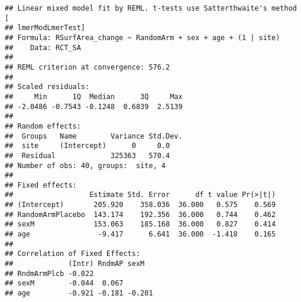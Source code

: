 \documentclass[]{article}
\theoremstyle{definition}
\theoremstyle{definition}
\theoremstyle{definition}
\theoremstyle{remark}
\begin{document}
\begin{verbatim}
## Linear mixed model fit by REML. t-tests use Satterthwaite's method [
## lmerModLmerTest]
## Formula: RSurfArea_change ~ RandomArm + sex + age + (1 | site)
##    Data: RCT_SA
## 
## REML criterion at convergence: 576.2
## 
## Scaled residuals: 
##     Min      1Q  Median      3Q     Max 
## -2.0486 -0.7543 -0.1248  0.6839  2.5139 
## 
## Random effects:
##  Groups   Name        Variance Std.Dev.
##  site     (Intercept)      0     0.0   
##  Residual             325363   570.4   
## Number of obs: 40, groups:  site, 4
## 
## Fixed effects:
##                  Estimate Std. Error      df t value Pr(>|t|)
## (Intercept)       205.920    358.036  36.000   0.575    0.569
## RandomArmPlacebo  143.174    192.356  36.000   0.744    0.462
## sexM              153.063    185.168  36.000   0.827    0.414
## age                -9.417      6.641  36.000  -1.418    0.165
## 
## Correlation of Fixed Effects:
##             (Intr) RndmAP sexM  
## RndmArmPlcb -0.022              
## sexM        -0.044  0.067       
## age         -0.921 -0.181 -0.201
\end{verbatim}
\end{document}
